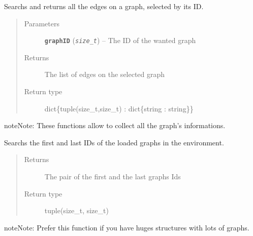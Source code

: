 \documentclass[letterpaper,10pt,english]{sphinxmanual}
\begin{document}

\begin{fulllineitems}
\label{doc:PythonGedLib.PyGetGraphEdges}
Searchs and returns all the edges on a graph, selected by its ID.
\begin{quote}\begin{description}
\item[{Parameters}] \leavevmode
\textbf{\texttt{graphID}} (\emph{\texttt{size\_t}}) -- The ID of the wanted graph

\item[{Returns}] \leavevmode
The list of edges on the selected graph

\item[{Return type}] \leavevmode
dict\{tuple(size\_t,size\_t) : dict\{string : string\}\}

\end{description}\end{quote}

\begin{notice}{note}{Note:}
These functions allow to collect all the graph's informations.
\end{notice}

\end{fulllineitems}


\begin{fulllineitems}
\label{doc:PythonGedLib.PyGetGraphIds}
Searchs the first and last IDs of the loaded graphs in the environment.
\begin{quote}\begin{description}
\item[{Returns}] \leavevmode
The pair of the first and the last graphs Ids

\item[{Return type}] \leavevmode
tuple(size\_t, size\_t)

\end{description}\end{quote}

\begin{notice}{note}{Note:}
Prefer this function if you have huges structures with lots of graphs.
\end{notice}

\end{fulllineitems}
\end{document}
